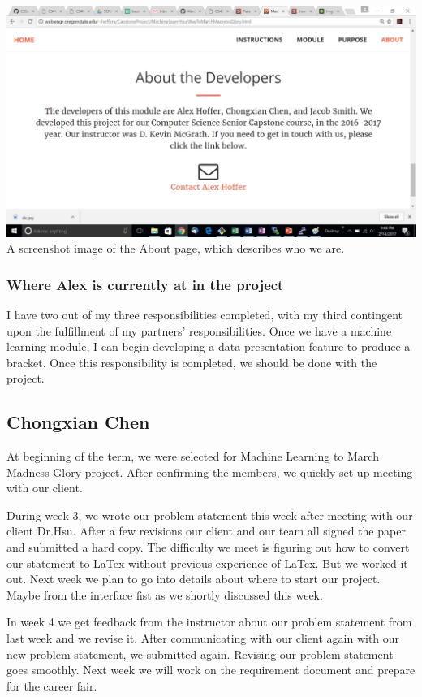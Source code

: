 \documentclass[letterpaper, 10pt,titlepage]{article}
\begin{document}
\includegraphics[width=\textwidth]{About.jpg}
A screenshot image of the About page, which describes who we are.

\subsubsection{Where Alex is currently at in the project}
\par I have two out of my three responsibilities completed, with my third contingent upon the fulfillment of my partners' responsibilities. Once we have a machine learning module, I can begin developing a data presentation feature to produce a bracket. Once this responsibility is completed, we should be done with the project.

\subsection{Chongxian Chen}
\par At beginning of the term, we were selected for Machine Learning to March Madness Glory project. After confirming the members, we quickly set up meeting with our client.
\par During week 3, we wrote our problem statement this week after meeting with our client Dr.Hsu. After a few revisions our client and our team all signed the paper and submitted a hard copy. The difficulty we meet is figuring out how to convert our statement to LaTex without previous experience of LaTex. But we worked it out. Next week we plan to go into details about where to start our project. Maybe from the interface fist as we shortly discussed this week.
\par In week 4 we get feedback from the instructor about our problem statement from last week and we revise it. After communicating with our client again with our new problem statement, we submitted again. Revising our problem statement goes smoothly. Next week we will work on the requirement document and prepare for the career fair.
\end{document}
